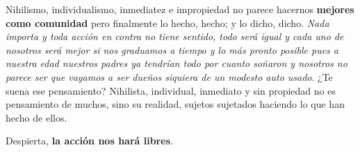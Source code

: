 Nihilismo, individualismo, inmediatez e impropiedad no parece hacernos
\textbf{mejores como comunidad} pero finalmente lo hecho, hecho; y lo dicho,
dicho. \emph{Nada importa y toda acción en contra no tiene sentido, todo será
igual y cada uno de nosotros será mejor si nos graduamos a tiempo y lo más
pronto posible pues a nuestra edad nuestros padres ya tendrían todo por cuanto
soñaron y nosotros no parece ser que vayamos a ser dueños siquiera de un modesto
auto usado}. ¿Te suena ese pensamiento? Nihilista, individual, inmediato y sin
propiedad no es pensamiento de muchos, sino su realidad, sujetos sujetados
haciendo lo que han hecho de ellos.

Despierta, \textbf{la acción nos hará libres}.

